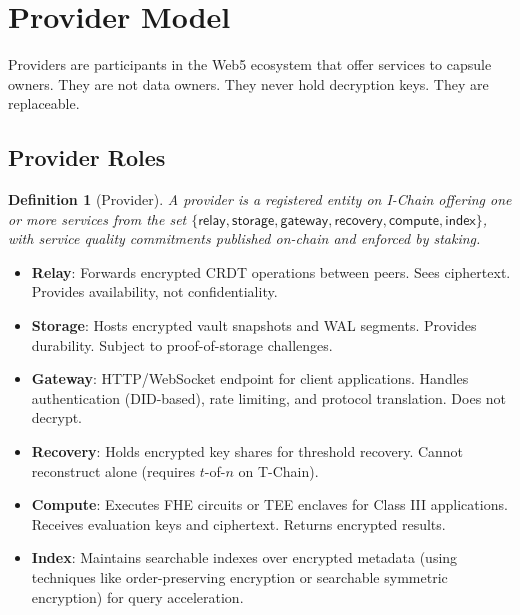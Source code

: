 \documentclass[11pt,a4paper]{article}
\newtheorem{definition}{Definition}[section]
\begin{document}
\section{Provider Model}\label{sec:providers}

Providers are participants in the Web5 ecosystem that offer services to capsule
owners. They are not data owners. They never hold decryption keys. They are
replaceable.

\subsection{Provider Roles}

\begin{definition}[Provider]\label{def:provider}
A provider is a registered entity on I-Chain offering one or more services from
the set $\{\mathsf{relay}, \mathsf{storage}, \mathsf{gateway}, \mathsf{recovery},
\mathsf{compute}, \mathsf{index}\}$, with service quality commitments published
on-chain and enforced by staking.
\end{definition}

\begin{itemize}[nosep]
  \item \textbf{Relay}: Forwards encrypted CRDT operations between peers.
        Sees ciphertext. Provides availability, not confidentiality.
  \item \textbf{Storage}: Hosts encrypted vault snapshots and WAL segments.
        Provides durability. Subject to proof-of-storage challenges.
  \item \textbf{Gateway}: HTTP/WebSocket endpoint for client applications.
        Handles authentication (DID-based), rate limiting, and protocol
        translation. Does not decrypt.
  \item \textbf{Recovery}: Holds encrypted key shares for threshold recovery.
        Cannot reconstruct alone (requires $t$-of-$n$ on T-Chain).
  \item \textbf{Compute}: Executes FHE circuits or TEE enclaves for Class III
        applications. Receives evaluation keys and ciphertext. Returns encrypted
        results.
  \item \textbf{Index}: Maintains searchable indexes over encrypted metadata
        (using techniques like order-preserving encryption or searchable
        symmetric encryption) for query acceleration.
\end{itemize}
\end{document}
